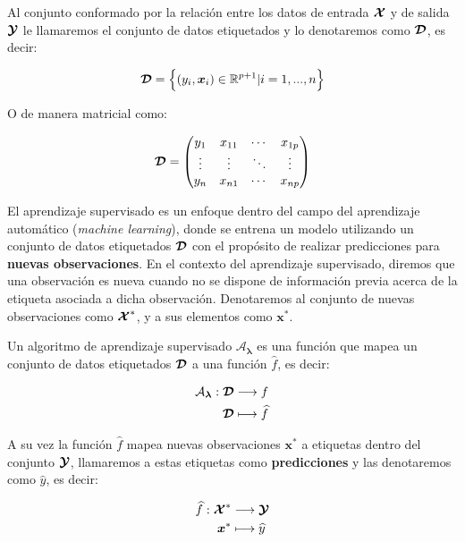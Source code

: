 Al conjunto conformado por la relación entre los datos de entrada $\boldsymbol{\mathcal{X}}$ y de salida $\boldsymbol{\mathcal{Y}}$ le llamaremos el conjunto de datos etiquetados y lo denotaremos como $\boldsymbol{\mathcal{D}}$, es decir: 

\begin{equation*}
    \boldsymbol{\mathcal{D}} = \Big\{(y_i, \boldsymbol{x}_i) \in \mathbb{R}^{p+1} | i = 1,...,n \Big\}
\end{equation*}

O de manera matricial como:

\begin{equation*}
    \boldsymbol{\mathcal{D}} = 
    \begin{pmatrix}
        y_{1}  & x_{11} & \cdots & x_{1p} \\
        \vdots & \vdots & \ddots & \vdots \\
        y_{n}  & x_{n1} & \cdots & x_{np}
    \end{pmatrix}
\end{equation*}

El aprendizaje supervisado es un enfoque dentro del campo del aprendizaje automático (\textit{machine learning}), donde se entrena un modelo utilizando un conjunto de datos etiquetados $\boldsymbol{\mathcal{D}}$ con el propósito de realizar predicciones para \textbf{nuevas observaciones}. En el contexto del aprendizaje supervisado, diremos que una observación es nueva cuando no se dispone de información previa acerca de la etiqueta asociada a dicha observación. Denotaremos al conjunto de nuevas observaciones como $\boldsymbol{\mathcal{X}}^*$, y a sus elementos como $\boldsymbol{x}^*$.

Un algoritmo de aprendizaje supervisado $\mathcal{A}_{\boldsymbol{\lambda}}$ es una función que mapea un conjunto de datos etiquetados $\boldsymbol{\mathcal{D}}$ a una función $\widehat{f}$, es decir:

\begin{alignat*}{1}
  \mathcal{A}_{\boldsymbol{\lambda}}: \boldsymbol{\mathcal{D}} &\longrightarrow f \\
               \boldsymbol{\mathcal{D}} &\longmapsto \widehat{f}
\end{alignat*}

A su vez la función $\widehat{f}$ mapea nuevas observaciones $\boldsymbol{x}^*$ a etiquetas dentro del conjunto $\boldsymbol{\mathcal{Y}}$, llamaremos a estas etiquetas como \textbf{predicciones} y las denotaremos como $\widehat{y}$, es decir:

\begin{alignat*}{1}
  \widehat{f}: \boldsymbol{\mathcal{X}}^* &\longrightarrow \boldsymbol{\mathcal{Y}} \\
                 \boldsymbol{x}^* &\longmapsto \widehat{y}
\end{alignat*}


